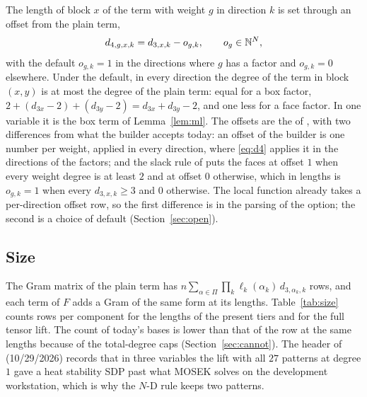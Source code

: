 The length of block $x$ of the term with weight $g$ in direction $k$ is set through an offset from the plain term,
\begin{equation}\label{eq:d4}
d_{4,g,x,k}=d_{3,x,k}-o_{g,k},\qquad o_g\in\mathbb{N}^N,
\end{equation}
with the default $o_{g,k}=1$ in the directions where $g$ has a factor and $o_{g,k}=0$ elsewhere. Under the default, in every direction the degree of the term in block $(x,y)$ is at most the degree of the plain term: equal for a box factor, $2+(d_{3x}-2)+(d_{3y}-2)=d_{3x}+d_{3y}-2$, and one less for a face factor. In one variable it is the box term of Lemma~\ref{lem:ml}. The offsets are the  of , with two differences from what the builder accepts today: an offset of the builder is one number per weight, applied in every direction, where \eqref{eq:d4} applies it in the directions of the factors; and the slack rule  of  puts the faces at offset $1$ when every weight degree is at least $2$ and at offset $0$ otherwise, which in lengths is $o_{g,k}=1$ when every $d_{3,x,k}\ge3$ and $0$ otherwise. The local function  already takes a per-direction offset row, so the first difference is in the parsing of the option; the second is a choice of default (Section~\ref{sec:open}).

\subsection{Size}

The Gram matrix of the plain term has $n\sum_{\alpha\in\Pi}\prod_k\ell_k(\alpha_k)\,d_{3,\alpha_k,k}$ rows, and each term of $F$ adds a Gram of the same form at its lengths. Table~\ref{tab:size} counts rows per component for the lengths of the present tiers and for the full tensor lift. The count of today's bases is lower than that of the row at the same lengths because of the total-degree caps (Section~\ref{sec:cannot}). The header of  (10/29/2026) records that in three variables the lift with all $27$ patterns at degree $1$ gave a heat stability SDP past what MOSEK solves on the development workstation, which is why the $N$-D rule keeps two patterns.

